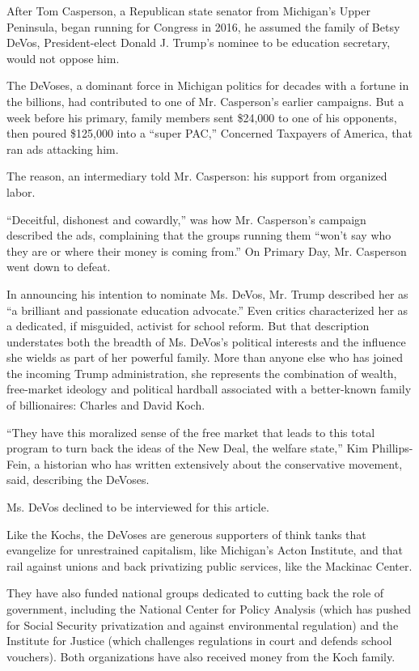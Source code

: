 After Tom Casperson, a Republican state senator from Michigan's Upper
Peninsula, began running for Congress in 2016, he assumed the family of
Betsy DeVos, President-elect Donald J. Trump's nominee to be education
secretary, would not oppose him.

The DeVoses, a dominant force in Michigan politics for decades with a
fortune in the billions, had contributed to one of Mr. Casperson's
earlier campaigns. But a week before his primary, family members sent
\$24,000 to one of his opponents, then poured \$125,000 into a ``super
PAC,'' Concerned Taxpayers of America, that ran ads attacking him.

The reason, an intermediary told Mr. Casperson: his support from
organized labor.

``Deceitful, dishonest and cowardly,'' was how Mr. Casperson's campaign
described the ads, complaining that the groups running them ``won't say
who they are or where their money is coming from.'' On Primary Day, Mr.
Casperson went down to defeat.

In announcing his intention to nominate Ms. DeVos, Mr. Trump described
her as ``a brilliant and passionate education advocate.'' Even critics
characterized her as a dedicated, if misguided, activist for school
reform. But that description understates both the breadth of Ms. DeVos's
political interests and the influence she wields as part of her powerful
family. More than anyone else who has joined the incoming Trump
administration, she represents the combination of wealth, free-market
ideology and political hardball associated with a better-known family of
billionaires: Charles and David Koch.

``They have this moralized sense of the free market that leads to this
total program to turn back the ideas of the New Deal, the welfare
state,'' Kim Phillips-Fein, a historian who has written extensively
about the conservative movement, said, describing the DeVoses.

Ms. DeVos declined to be interviewed for this article.

Like the Kochs, the DeVoses are generous supporters of think tanks that
evangelize for unrestrained capitalism, like Michigan's Acton Institute,
and that rail against unions and back privatizing public services, like
the Mackinac Center.

They have also funded national groups dedicated to cutting back the role
of government, including the National Center for Policy Analysis (which
has pushed for Social Security privatization and against environmental
regulation) and the Institute for Justice (which challenges regulations
in court and defends school vouchers). Both organizations have also
received money from the Koch family.

